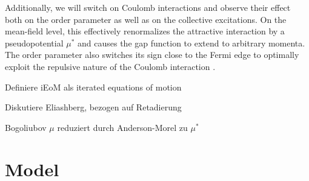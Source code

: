 \documentclass[
    reprint, 
    aps,
    preprintnumbers,
    twocolumn,
    prb,
    superscriptaddress
]{revtex4-2}
\begin{document}
Additionally, we will switch on Coulomb interactions and observe their effect both on the order parameter as well as on the collective excitations.
On the mean-field level, this effectively renormalizes the attractive interaction by a pseudopotential $\mu^*$ \cite{bogoliubov1958,morel1962}
and causes the gap function to extend to arbitrary momenta.
The order parameter also switches its sign close to the Fermi edge to optimally exploit the repulsive nature of the Coulomb interaction \cite{morel1962,carbotte1990,sigrist2005}.



\textbullet Definiere iEoM als iterated equations of motion

\textbullet Diskutiere Eliashberg, bezogen auf Retadierung \cite{kehrein2006}

\textbullet Bogoliubov $\mu$ \cite{bogoliubov1958} reduziert durch Anderson-Morel zu $\mu^*$ \cite{morel1962}


\section{Model}\label{sec:model}
\end{document}
